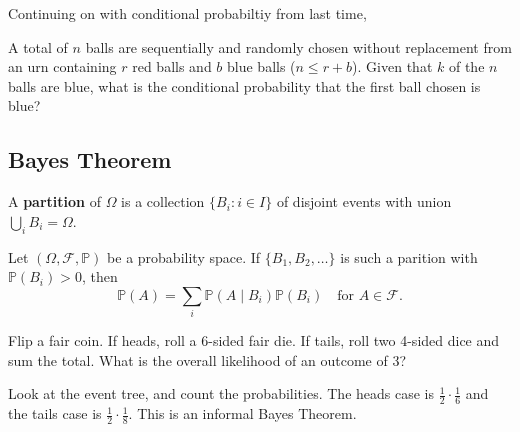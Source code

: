 
Continuing on with conditional probabiltiy from last time,

\begin{eg}
	A total of \( n \) balls are sequentially and randomly chosen without replacement from an urn containing \( r \) red balls and \( b \) blue balls (\( n\le r+b \)). Given that \( k \) of the \( n \) balls are blue, what is the conditional probability that the first ball chosen is blue?
\end{eg}

\subsection{Bayes Theorem}

\begin{definition}
	A \textbf{partition} of \( \Omega  \) is a collection \( \{ B_i : i \in I \} \) of disjoint events with union \( \bigcup_i B_i = \Omega  \). 
\end{definition}

\begin{theorem}
	Let \( (\Omega, \mathcal{F}, \mathbb{P}) \) be a probability space. If \( \{B_{1},B_{2},\ldots \}   \) is such a parition with \( \mathbb{P}(B_i) > 0\), then \[
		\mathbb{P}(A) = \sum_i \mathbb{P}(A \mid B_i) \mathbb{P}(B_i) \quad \text{for } A \in \mathcal{F}
	.\] 
\end{theorem}

\begin{eg}
	Flip a fair coin. If heads, roll a 6-sided fair die. If tails, roll two 4-sided dice and sum the total. What is the overall likelihood of an outcome of 3?
\end{eg}
\begin{explanation}
	Look at the event tree, and count the probabilities. The heads case is \( \frac{1}{2} \cdot \frac{1}{6} \) and the tails case is \( \frac{1}{2}\cdot \frac{1}{8} \). This is an informal Bayes Theorem.
\end{explanation}

